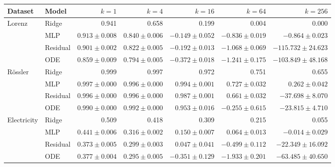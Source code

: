 \begin{tabular}{llrrrrr}
\toprule
Dataset & Model & $k=1$ & $k=4$ & $k=16$ & $k=64$ & $k=256$ \\
\midrule
Lorenz & Ridge & 0.941 & 0.658 & 0.199 & 0.004 & 0.000 \\
 & MLP & $0.913\pm0.008$ & $0.840\pm0.006$ & $-0.149\pm0.052$ & $-0.836\pm0.019$ & $-0.864\pm0.023$ \\
 & Residual & $0.901\pm0.002$ & $0.822\pm0.005$ & $-0.192\pm0.013$ & $-1.068\pm0.069$ & $-115.732\pm24.623$ \\
 & ODE & $0.859\pm0.009$ & $0.794\pm0.005$ & $-0.372\pm0.018$ & $-1.241\pm0.175$ & $-103.849\pm48.168$ \\
R\"ossler & Ridge & 0.999 & 0.997 & 0.972 & 0.751 & 0.655 \\
 & MLP & $0.997\pm0.000$ & $0.996\pm0.000$ & $0.994\pm0.001$ & $0.727\pm0.032$ & $0.262\pm0.042$ \\
 & Residual & $0.996\pm0.000$ & $0.996\pm0.000$ & $0.987\pm0.001$ & $0.661\pm0.032$ & $-37.698\pm8.070$ \\
 & ODE & $0.990\pm0.000$ & $0.992\pm0.000$ & $0.953\pm0.016$ & $-0.255\pm0.615$ & $-23.815\pm4.710$ \\
Electricity & Ridge & 0.509 & 0.418 & 0.309 & 0.215 & 0.055 \\
 & MLP & $0.441\pm0.006$ & $0.316\pm0.002$ & $0.150\pm0.007$ & $0.064\pm0.013$ & $-0.014\pm0.029$ \\
 & Residual & $0.373\pm0.005$ & $0.299\pm0.003$ & $0.047\pm0.041$ & $-0.499\pm0.112$ & $-22.349\pm16.092$ \\
 & ODE & $0.377\pm0.004$ & $0.295\pm0.005$ & $-0.351\pm0.129$ & $-1.933\pm0.201$ & $-63.485\pm40.650$ \\
\bottomrule
\end{tabular}
